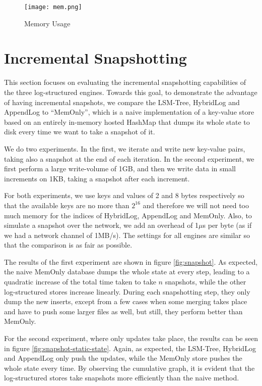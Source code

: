 \begin{figure}[h]
    \centering
    \texttt{[image: mem.png]}
    \caption{Memory Usage}
    \label{fig:comparison-memory}
\end{figure}

\section{Incremental Snapshotting}

This section focuses on evaluating the incremental snapshotting capabilities of the three log-structured engines. Towards this goal, to demonstrate the advantage of having incremental snapshots, we compare the LSM-Tree, HybridLog and AppendLog to ``MemOnly'', which is a naive implementation of a key-value store based on an entirely in-memory hosted HashMap that dumps its whole state to disk every time we want to take a snapshot of it.

We do two experiments. In the first, we iterate and write new key-value pairs, taking also a snapshot at the end of each iteration. In the second experiment, we first perform a large write-volume of 1GB, and then we write data in small increments on 1KB, taking a snapshot after each increment.

For both experiments, we use keys and values of 2 and 8 bytes respectively so that the available keys are no more than $2^{16}$ and therefore we will not need too much memory for the indices of HybridLog, AppendLog and MemOnly. Also, to simulate a snapshot over the network, we add an overhead of 1$\mu$s per byte (as if we had a network channel of 1MB/s). The settings for all engines are similar so that the comparison is as fair as possible.

The results of the first experiment are shown in figure \ref{fig:snapshot}. As expected, the naive MemOnly database dumps the whole state at every step, leading to a quadratic increase of the total time taken to take $n$ snapshots, while the other log-structured stores increase linearly. During each snapshotting step, they only dump the new inserts, except from a few cases when some merging takes place and have to push some larger files as well, but still, they perform better than MemOnly.

For the second experiment, where only updates take place, the results can be seen in figure \ref{fig:snapshot-static-state}. Again, as expected, the LSM-Tree, HybridLog and AppendLog only push the updates, while the MemOnly store pushes the whole state every time. By observing the cumulative graph, it is evident that the log-structured stores take snapshots more efficiently than the naive method.

